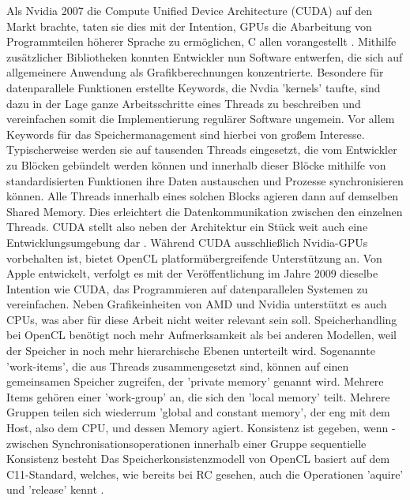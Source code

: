 \documentclass[final,bibliography=totocnumbered]{include/sikseminar}
\begin{document}
Als Nvidia 2007 die Compute Unified Device Architecture (CUDA) auf den Markt brachte, taten sie dies mit der Intention, GPUs die Abarbeitung von Programmteilen höherer Sprache zu ermöglichen, C allen vorangestellt \cite{syncornot}.
Mithilfe zusätzlicher Bibliotheken konnten Entwickler nun Software entwerfen, die sich auf allgemeinere Anwendung als Grafikberechnungen konzentrierte.
Besondere für datenparallele Funktionen erstellte Keywords, die Nvdia 'kernels' taufte, sind dazu in der Lage ganze Arbeitsschritte eines Threads zu beschreiben und vereinfachen somit die Implementierung regulärer Software ungemein. Vor allem Keywords für das Speichermanagement sind hierbei von großem Interesse.
Typischerweise werden sie auf tausenden Threads eingesetzt, die vom Entwickler zu Blöcken gebündelt werden können und innerhalb dieser Blöcke mithilfe von standardisierten Funktionen ihre Daten austauschen und Prozesse synchronisieren können.
Alle Threads innerhalb eines solchen Blocks agieren dann auf demselben Shared Memory. Dies erleichtert die Datenkommunikation zwischen den einzelnen Threads. 
 CUDA stellt also neben der Architektur ein Stück weit auch eine Entwicklungsumgebung dar  \cite{exploit}.
Während CUDA ausschließlich Nvidia-GPUs vorbehalten ist, bietet OpenCL platformübergreifende Unterstützung an.
Von Apple entwickelt, verfolgt es mit der Veröffentlichung im Jahre 2009 dieselbe Intention wie CUDA, das Programmieren auf datenparallelen Systemen zu vereinfachen.
Neben Grafikeinheiten von AMD und Nvidia unterstützt es auch CPUs, was aber für diese Arbeit nicht weiter relevant sein soll.
Speicherhandling bei OpenCL benötigt noch mehr Aufmerksamkeit als bei anderen Modellen, weil der Speicher in noch mehr hierarchische Ebenen unterteilt wird.
Sogenannte 'work-items', die aus Threads zusammengesetzt sind, können auf einen gemeinsamen Speicher zugreifen, der 'private memory' genannt wird.
Mehrere Items gehören einer 'work-group' an, die sich den 'local memory' teilt.  Mehrere Gruppen teilen sich wiederrum 'global and constant memory', der eng mit dem Host, also dem CPU, und dessen Memory agiert\cite{optim}.
Konsistenz ist gegeben, wenn 
-  zwischen Synchronisationsoperationen innerhalb einer Gruppe sequentielle Konsistenz besteht
Das Speicherkonsistenzmodell von OpenCL basiert auf dem C11-Standard, welches, wie bereits bei RC gesehen, auch die Operationen 'aquire' und 'release' kennt \cite{denovor}.


\end{document}
